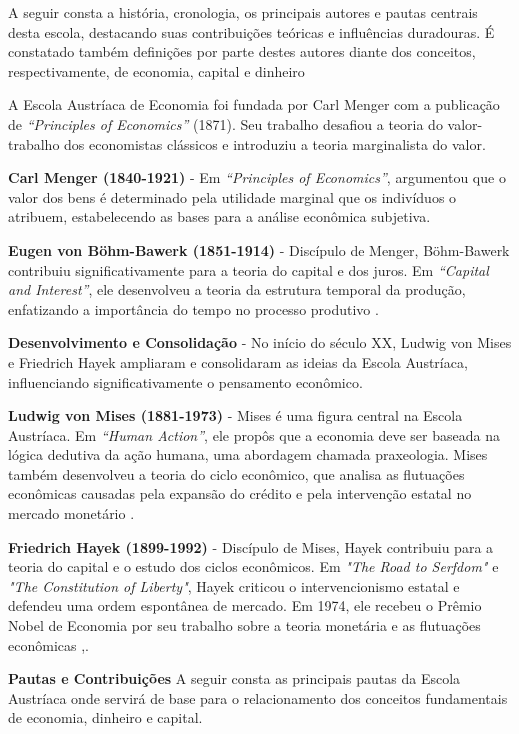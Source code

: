 \documentclass[article,12pt,oneside,a4paper,english,brazil]{unifil}
\begin{document}
\begin{Spacing}{1.5}
A seguir consta a história, cronologia, os principais autores e pautas centrais desta escola, destacando suas contribuições teóricas e influências duradouras. É constatado também definições por parte destes autores diante dos conceitos, respectivamente, de economia, capital e dinheiro

A Escola Austríaca de Economia foi fundada por Carl Menger com a publicação de \textit{``Principles of Economics''} (1871). Seu trabalho desafiou a teoria do valor-trabalho dos economistas clássicos e introduziu a teoria marginalista do valor.

\textbf{Carl Menger (1840-1921)} - Em \textit{``Principles of Economics''}, \cite{menger1871principles} argumentou que o valor dos bens é determinado pela utilidade marginal que os indivíduos o atribuem, estabelecendo as bases para a análise econômica subjetiva.

\textbf{Eugen von Böhm-Bawerk (1851-1914)} - Discípulo de Menger, Böhm-Bawerk contribuiu significativamente para a teoria do capital e dos juros. Em \textit{``Capital and Interest''}, ele desenvolveu a teoria da estrutura temporal da produção, enfatizando a importância do tempo no processo produtivo \cite{bohm1884capital}.

\textbf{Desenvolvimento e Consolidação} -
No início do século XX, Ludwig von Mises e Friedrich Hayek ampliaram e consolidaram as ideias da Escola Austríaca, influenciando significativamente o pensamento econômico.

\textbf{Ludwig von Mises (1881-1973)} - Mises é uma figura central na Escola Austríaca. Em \textit{``Human Action''}, ele propôs que a economia deve ser baseada na lógica dedutiva da ação humana, uma abordagem chamada praxeologia. Mises também desenvolveu a teoria do ciclo econômico, que analisa as flutuações econômicas causadas pela expansão do crédito e pela intervenção estatal no mercado monetário \cite{mises1949human}.

\textbf{Friedrich Hayek (1899-1992)} - Discípulo de Mises, Hayek contribuiu para a teoria do capital e o estudo dos ciclos econômicos. Em \textit{"The Road to Serfdom"} e \textit{"The Constitution of Liberty"}, Hayek criticou o intervencionismo estatal e defendeu uma ordem espontânea de mercado. Em 1974, ele recebeu o Prêmio Nobel de Economia por seu trabalho sobre a teoria monetária e as flutuações econômicas \cite{hayek1944road},\cite{hayek1960constitution}.

\textbf{Pautas e Contribuições} A seguir consta as principais pautas da Escola Austríaca onde servirá de base para o relacionamento dos conceitos fundamentais de economia, dinheiro e capital.


\end{Spacing}
\end{document}
